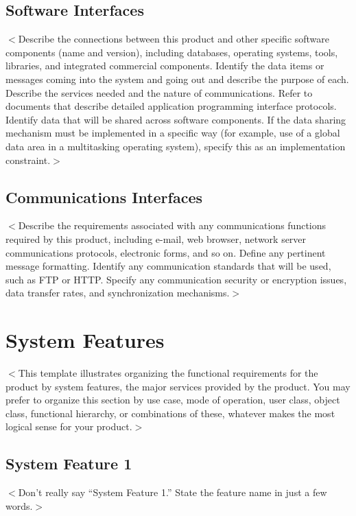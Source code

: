\documentclass{scrreprt}
\begin{document}
\section{Software Interfaces}
\begin{CJK}{UTF8}{<font>}
$<$Describe the connections between this product and other specific software 
components (name and version), including databases, operating systems, tools, 
libraries, and integrated commercial components. Identify the data items or 
messages coming into the system and going out and describe the purpose of each.  
Describe the services needed and the nature of communications. Refer to 
documents that describe detailed application programming interface protocols.  
Identify data that will be shared across software components. If the data 
sharing mechanism must be implemented in a specific way (for example, use of a 
global data area in a multitasking operating system), specify this as an 
implementation constraint.$>$
\end{CJK}

\section{Communications Interfaces}
\begin{CJK}{UTF8}{<font>}
$<$Describe the requirements associated with any communications functions 
required by this product, including e-mail, web browser, network server 
communications protocols, electronic forms, and so on. Define any pertinent 
message formatting. Identify any communication standards that will be used, such 
as FTP or HTTP. Specify any communication security or encryption issues, data 
transfer rates, and synchronization mechanisms.$>$
\end{CJK}


\chapter{System Features}
\begin{CJK}{UTF8}{<font>}
$<$This template illustrates organizing the functional requirements for the 
product by system features, the major services provided by the product. You may 
prefer to organize this section by use case, mode of operation, user class, 
object class, functional hierarchy, or combinations of these, whatever makes the 
most logical sense for your product.$>$
\end{CJK}

\section{System Feature 1}
$<$Don’t really say “System Feature 1.” State the feature name in just a few 
words.$>$
\end{document}
